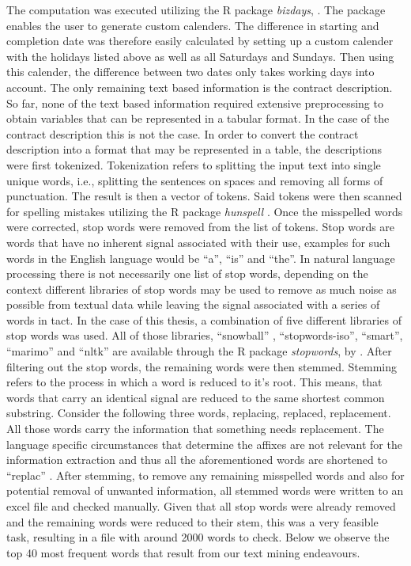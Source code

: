 \documentclass[a4paper,12pt, headsepline]{scrartcl}
\numberwithin{equation}{section}
\begin{document}
 The computation was executed utilizing the R package \textit{bizdays}, \citet{bizdays}. The package enables the user to generate custom calenders. The difference in starting and completion date was therefore easily calculated by setting up a custom calender with the holidays listed above as well as all Saturdays and Sundays. Then using this calender, the difference between two dates only takes working days into account.
 The only remaining text based information is the contract description. So far, none of the text based information required extensive preprocessing to obtain variables that can be represented in a tabular format. In the case of the contract description this is not the case. In order to convert the contract description into a format that may be represented in a table, the descriptions were first tokenized. Tokenization refers to splitting the input text into single unique words, i.e., splitting the sentences on spaces and removing all forms of punctuation. The result is then a vector of tokens. Said tokens were then scanned for spelling mistakes utilizing the R package \textit{hunspell} \citep{hunspell}. Once the misspelled words were corrected, stop words were removed from the list of tokens. Stop words are words that have no inherent signal associated with their use, examples for such words in the English language would be \enquote{a}, \enquote{is} and \enquote{the}. In natural language processing there is not necessarily one list of stop words, depending on the context different libraries of stop words may be used to remove as much noise as possible from textual data while leaving the signal associated with a series of words in tact. In the case of this thesis, a combination of five different libraries of stop words was used. All of those libraries, \enquote{snowball} , \enquote{stopwords-iso}, 
 \enquote{smart}, \enquote{marimo} and \enquote{nltk} are available through the R package \textit{stopwords}, by \citet{stopwords}. After filtering out the stop words, the remaining words were then stemmed. Stemming refers to the process in which a word is reduced to it's root. This means, that words that carry an identical signal are reduced to the same shortest common substring. Consider the following three words, replacing, replaced, replacement. All those words carry the information that something needs replacement. The language specific circumstances that determine the affixes are not relevant for the information extraction and thus all the aforementioned words are shortened to \enquote{replac} \citet{textminingR}. After stemming, to remove any remaining misspelled words and also for potential removal of unwanted information, all stemmed words were written to an excel file and checked manually. Given that all stop words were already removed and the remaining words were reduced to their stem, this was a very feasible task, resulting in a file with around 2000 words to check. Below we observe the top 40 most frequent words that result from our text mining endeavours.
 
\end{document}
